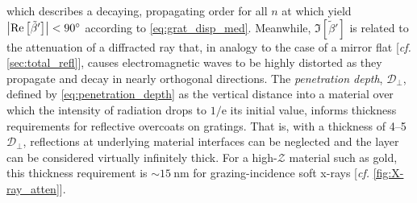 which describes a decaying, propagating order for all $n$ at which yield $\abs{\Re \left[ \tilde{\beta}' \right]} < 90^{\circ}$ according to \cref{eq:grat_disp_med}. 
Meanwhile, $\Im \left[ \tilde{\beta}' \right]$ is related to the attenuation of a diffracted ray that, in analogy to the case of a mirror flat [\emph{cf.\@} \cref{sec:total_refl}], causes electromagnetic waves to be highly distorted as they propagate and decay in nearly orthogonal directions. 
The \emph{penetration depth}, $\mathcal{D}_{\perp}$, defined by \cref{eq:penetration_depth} as the vertical distance into a material over which the intensity of radiation drops to $1/\mathrm{e}$ its initial value, informs thickness requirements for reflective overcoats on gratings. 
That is, with a thickness of \numrange{4}{5} $\mathcal{D}_{\perp}$, reflections at underlying material interfaces can be neglected and the layer can be considered virtually infinitely thick. 
For a high-$\mathcal{Z}$ material such as gold, this thickness requirement is $\sim \SI{15}{\nm}$ for grazing-incidence soft x-rays [\emph{cf.\@} \cref{fig:X-ray_atten}]. 


